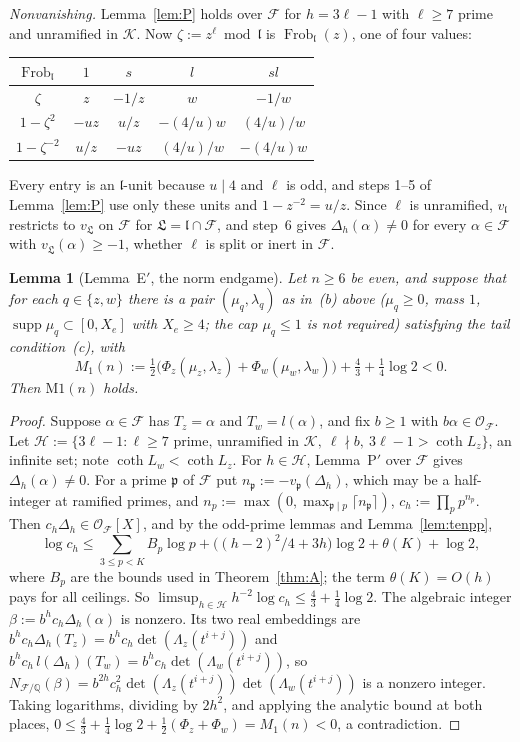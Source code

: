 \documentclass[11pt]{amsart}
\newtheorem{lemma}[theorem]{Lemma}
\theoremstyle{definition}
\theoremstyle{remark}
\numberwithin{equation}{section}
\newcommand{\QQ}{\mathbb{Q}}
\newcommand{\cK}{\mathcal{K}}
\newcommand{\cF}{\mathcal{F}}
\newcommand{\cO}{\mathcal{O}}
\newcommand{\fp}{\mathfrak{p}}
\newcommand{\fl}{\mathfrak{l}}
\newcommand{\fL}{\mathfrak{L}}
\begin{document}
\emph{Nonvanishing.} Lemma~\ref{lem:P} holds over $\cF$ for $h=3\ell-1$ with $\ell\ge7$ prime and unramified in $\cK$.
Now $\zeta:=z^\ell\bmod\fl$ is $\operatorname{Frob}_\fl(z)$, one of four values:
\begin{center}
\begin{tabular}{@{}ccccc@{}}
\toprule
$\operatorname{Frob}_\fl$ & $1$ & $s$ & $l$ & $sl$\\
\midrule
$\zeta$ & $z$ & $-1/z$ & $w$ & $-1/w$\\
$1-\zeta^2$ & $-uz$ & $u/z$ & $-(4/u)w$ & $(4/u)/w$\\
$1-\zeta^{-2}$ & $u/z$ & $-uz$ & $(4/u)/w$ & $-(4/u)w$\\
\bottomrule
\end{tabular}
\end{center}
Every entry is an $\fl$-unit because $u\mid4$ and $\ell$ is odd, and steps 1--5 of Lemma~\ref{lem:P} use only these units
and $1-z^{-2}=u/z$. Since $\ell$ is unramified, $v_\fl$ restricts to $v_\fL$ on $\cF$ for $\fL=\fl\cap\cF$, and step~6
gives $\Delta_h(\alpha)\ne0$ for every $\alpha\in\cF$ with $v_\fL(\alpha)\ge-1$, whether $\ell$ is split or inert in $\cF$.

\begin{lemma}[Lemma~E$'$, the norm endgame]\label{lem:Eprime}
Let $n\ge6$ be even, and suppose that for each $q\in\{z,w\}$ there is a pair $(\mu_q,\lambda_q)$ as in~(b) above
($\mu_q\ge0$, mass $1$, $\operatorname{supp}\mu_q\subset[0,X_e]$ with $X_e\ge4$; the cap $\mu_q\le1$ is not required)
satisfying the tail condition~(c), with
\[
  M_1(n):=\tfrac12\bigl(\Phi_z(\mu_z,\lambda_z)+\Phi_w(\mu_w,\lambda_w)\bigr)+\tfrac43+\tfrac14\log2<0 .
\]
Then $\mathrm{M1}(n)$ holds.
\end{lemma}

\begin{proof}
Suppose $\alpha\in\cF$ has $T_z=\alpha$ and $T_w=l(\alpha)$, and fix $b\ge1$ with $b\alpha\in\cO_\cF$. Let
$\mathcal H:=\{3\ell-1:\ell\ge7\text{ prime, unramified in }\cK,\ \ell\nmid b,\ 3\ell-1>\coth L_z\}$, an infinite set; note
$\coth L_w<\coth L_z$. For $h\in\mathcal H$, Lemma~P$'$ over $\cF$ gives $\Delta_h(\alpha)\ne0$. For a prime $\fp$ of $\cF$
put $n_\fp:=-v_\fp(\Delta_h)$, which may be a half-integer at ramified primes, and $n_p:=\max(0,\max_{\fp\mid p}\lceil
n_\fp\rceil)$, $c_h:=\prod_pp^{n_p}$. Then $c_h\Delta_h\in\cO_\cF[X]$, and by the odd-prime lemmas and
Lemma~\ref{lem:tenpp},
\[
  \log c_h\le\sum_{3\le p<K}B_p\log p+\bigl((h-2)^2/4+3h\bigr)\log2+\theta(K)+\log2,
\]
where $B_p$ are the bounds used in Theorem~\ref{thm:A}; the term $\theta(K)=O(h)$ pays for all ceilings. So
$\limsup_{h\in\mathcal H}h^{-2}\log c_h\le\frac43+\frac14\log2$. The algebraic integer $\beta:=b^hc_h\Delta_h(\alpha)$ is
nonzero. Its two real embeddings are $b^hc_h\Delta_h(T_z)=b^hc_h\det(\Lambda_z(t^{i+j}))$ and
$b^hc_h\,l(\Delta_h)(T_w)=b^hc_h\det(\Lambda_w(t^{i+j}))$, so
$N_{\cF/\QQ}(\beta)=b^{2h}c_h^2\det(\Lambda_z(t^{i+j}))\det(\Lambda_w(t^{i+j}))$ is a nonzero integer. Taking logarithms,
dividing by $2h^2$, and applying the analytic bound at both places,
$0\le\frac43+\frac14\log2+\frac12(\Phi_z+\Phi_w)=M_1(n)<0$, a contradiction.
\end{proof}
\end{document}
